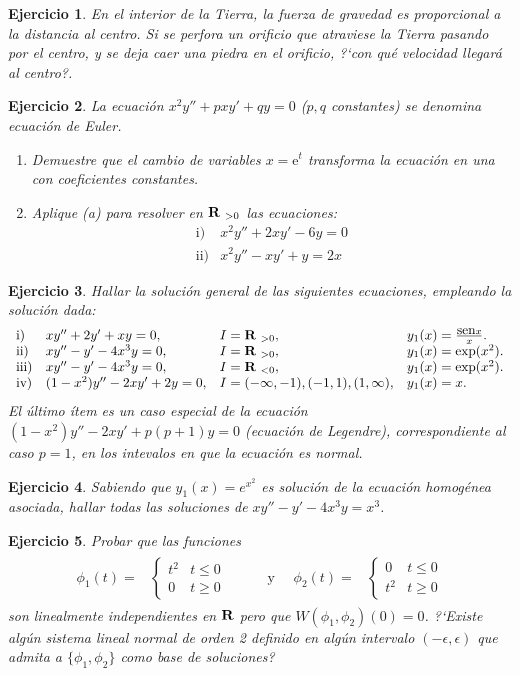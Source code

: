 \documentclass[11pt]{article}
\newtheorem{ej}{Ejercicio}%
\newcommand{\erre}{\mbox{${\bf R}\ $}}
\newcommand{\bej}[1]{\begin{ej}\rm{#1}}
\newcommand{\eej}{\end{ej}\vspace{-0.2cm}}
\begin{document}
\bej En el interior de la Tierra, la fuerza de gravedad es
proporcional a la distancia al centro. Si se perfora un orificio
que atraviese la Tierra pasando por el centro, y se deja caer
una piedra en el orificio, ?`con qu\'e velocidad llegar\'a al centro?.
\eej

\bej La ecuaci\'on $x^{2}y''+pxy'+qy=0$ ($p,q$ constantes) se denomina
ecuaci\'on de Euler.

\begin{enumerate}
\item Demuestre que el cambio de variables $x= \mbox{e}^{t}$ transforma la
ecuaci\'on en una con coeficientes constantes.

\item Aplique (a) para resolver en $\erre_{>0}$ las ecuaciones:
\[
\begin{array}{ll}
\mbox{i)}&x^{2}y''+2xy'-6y=0\\
\mbox{ii)}&x^{2}y''-xy'+y=2x
\end{array}
\]
\end{enumerate}
\eej


\bej Hallar la soluci\'on general de las siguientes ecuaciones, empleando la
soluci\'on dada:
\[
\begin{array}{llll}
\mbox{i)}&xy''+2y'+xy=0, & I=\erre_{>0}, & y_{1}(x)=\frac{\mbox{sen}x}{x}.\\
\mbox{ii)}&xy''-y'-4x^{3}y=0, & I=\erre_{>0}, & y_{1}(x)=\exp (x^{2}).\\
\mbox{iii)}&xy''-y'-4x^{3}y=0, & I=\erre_{<0}, & y_{1}(x)=\exp (x^{2}).\\
\mbox{iv)}&(1-x^{2})y''-2xy'+2y=0, & I=(-\infty,-1), (-1,1), (1, \infty), 
& y_{1}(x)=x.
\end{array}
\]
El último ítem es un caso especial de la ecuaci\'on $(1-x^{2})y''
-2xy'+p(p+1)y=0$ (ecuaci\'on de Legendre), correspondiente al caso $p=1$,
 en los intevalos en que la
ecuaci\'on es normal.
\eej

\bej Sabiendo que $y_{1}(x)=e^{x^2}$ es
soluci\'on de la ecuaci\'on homog\'enea asociada, hallar todas las
soluciones de $xy''-y'-4x^3y=x^3$.

\eej

\bej Probar que las funciones
\[
\begin{array}{cc}
\begin{array}{ll}
\phi _{1}(t)= &\left\{ \begin{array}{ll}
t^{2}&t \le 0\\
0&t\geq 0
\end{array}
\right.
\end{array}
&
\begin{array}{ll}
\quad \text{ y }\quad \phi _{2}(t)= &\left\{ \begin{array}{ll}
0&t \le 0\\
t^{2}&t\geq 0
\end{array}
\right.
\end{array}
\end{array}
\]
son linealmente independientes en \erre pero que $W(\phi_{1}, \phi_{2})(0)=0$.
?`Existe alg\'un sistema lineal normal de orden 2 definido en alg\'un intervalo
$(-\epsilon, \epsilon)$ que admita a $\{ \phi_{1}, \phi_{2}\}$ como base de
soluciones?
\eej
\end{document}
